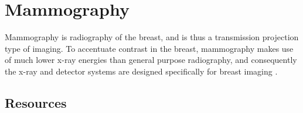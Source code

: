 \chapter{Mammography}

Mammography is radiography of the breast, and is thus a transmission
projection type of imaging. To accentuate contrast in the breast,
mammography makes use of much lower x-ray energies than general
purpose radiography, and consequently the x-ray and detector systems
are designed specifically for breast imaging
\cite{bushberg2011essential}.

\section{Resources}


